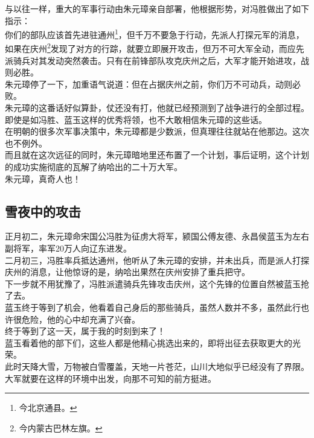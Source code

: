 \begin{multicols}{\theparacolNo}
与以往一样，重大的军事行动由朱元璋亲自部署，他根据形势，对冯胜做出了如下指示：\\

你们的部队应该首先进驻通州\footnote{今北京通县。}，但千万不要急于行动，先派人打探元军的消息，如果在庆州\footnote{今内蒙古巴林左旗。}发现了对方的行踪，就要立即展开攻击，但万不可大军全动，而应先派骑兵对其发动突然袭击。只有在前锋部队攻克庆州之后，大军才能开始进攻，战则必胜。\\

朱元璋停了一下，加重语气说道：但在占据庆州之前，你们万不可动兵，动则必败。\\

朱元璋的这番话好似算卦，仗还没有打，他就已经预测到了战争进行的全部过程。即使是如冯胜、蓝玉这样的优秀将领，也不大敢相信朱元璋的这些话。\\

在明朝的很多次军事决策中，朱元璋都是少数派，但真理往往就站在他那边。这次也不例外。\\

而且就在这次远征的同时，朱元璋暗地里还布置了一个计划，事后证明，这个计划的成功实施彻底的瓦解了纳哈出的二十万大军。\\

朱元璋，真奇人也！\\

\subsection{雪夜中的攻击}
正月初二，朱元璋命宋国公冯胜为征虏大将军，颍国公傅友德、永昌侯蓝玉为左右副将军，率军20万人向辽东进发。\\

二月初三，冯胜率兵抵达通州，他听从了朱元璋的安排，并未出兵，而是派人打探庆州的消息，让他惊讶的是，纳哈出果然在庆州安排了重兵把守。\\

下一步就不用犹豫了，冯胜派遣骑兵先锋攻击庆州，这个先锋的位置自然被蓝玉抢了去。\\

蓝玉终于等到了机会，他看着自己身后的那些骑兵，虽然人数并不多，虽然此行也许很危险，他的心中却充满了兴奋。\\

终于等到了这一天，属于我的时刻到来了！\\

蓝玉看着他的部下们，这些人都是他精心挑选出来的，即将出征去获取更大的光荣。\\

此时天降大雪，万物被白雪覆盖，天地一片苍茫，山川大地似乎已经没有了界限。大军就要在这样的环境中出发，向那不可知的前方挺进。\\


\end{multicols}
